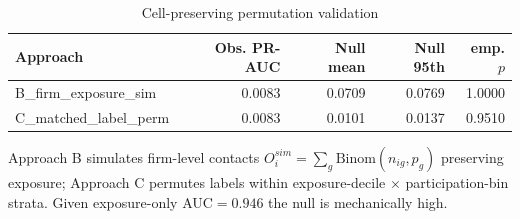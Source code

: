 \begin{table}[htbp]\centering
\caption{Cell-preserving permutation validation}
\label{tab:opp_permutation}
\begin{tabular}{lrrrr}\hline
Approach & Obs. PR-AUC & Null mean & Null 95th & emp. $p$ \\\hline
B\_firm\_exposure\_sim & 0.0083 & 0.0709 & 0.0769 & 1.0000 \\
C\_matched\_label\_perm & 0.0083 & 0.0101 & 0.0137 & 0.9510 \\
\hline\end{tabular}
\begin{tablenotes}\footnotesize\item Approach B simulates firm-level contacts $O_i^{sim}=\sum_g \text{Binom}(n_{ig},p_g)$ preserving exposure; Approach C permutes labels within exposure-decile $\times$ participation-bin strata. Given exposure-only AUC$=0.946$ the null is mechanically high.\end{tablenotes}
\end{table}
